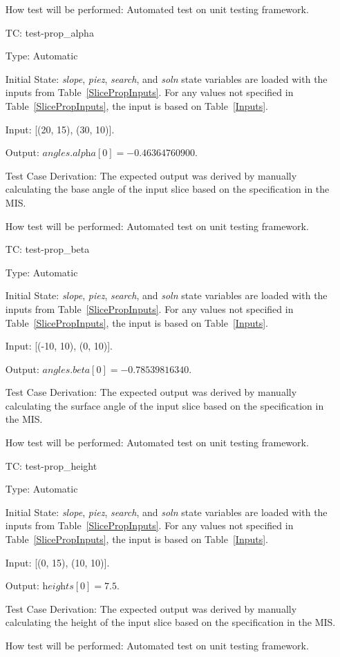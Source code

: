 \documentclass[12pt, titlepage]{article}
\newcounter{utestnum} %
\begin{document}
\begin{enumerate}[label=TC\arabic*:,ref={\arabic*}]
	How test will be performed: Automated test on unit testing framework.
	
	\item [TC\refstepcounter{utestnum}\theutestnum: 
	\label{TC_PropertyAlpha}] 
	test-prop\_alpha
	
	Type: Automatic
	
	Initial State: \textit{slope}, \textit{piez}, \textit{search}, and 
	\textit{soln} state variables are loaded with the inputs from 
	Table~\ref{SlicePropInputs}. For any values not specified in 
	Table~\ref{SlicePropInputs}, the input is based on Table~\ref{Inputs}.
	
	Input: [(20, 15), (30, 10)].
	
	Output: $\textit{angles.alpha}[0] = -0.46364760900$.
	
	Test Case Derivation: The expected output was derived by manually 
	calculating the base angle of the input slice based on the specification in 
	the MIS.
	
	How test will be performed: Automated test on unit testing framework.
	
	\item [TC\refstepcounter{utestnum}\theutestnum: 
	\label{TC_PropertyBeta}] 
	test-prop\_beta
	
	Type: Automatic
	
	Initial State: \textit{slope}, \textit{piez}, \textit{search}, and 
	\textit{soln} state variables are loaded with the inputs from 
	Table~\ref{SlicePropInputs}. For any values not specified in 
	Table~\ref{SlicePropInputs}, the input is based on Table~\ref{Inputs}.
	
	Input: [(-10, 10), (0, 10)].
	
	Output: $\textit{angles.beta}[0] = -0.78539816340$.
	
	Test Case Derivation: The expected output was derived by manually 
	calculating the surface angle of the input slice based on the specification 
	in the MIS.
	
	How test will be performed: Automated test on unit testing framework.
	
	\item [TC\refstepcounter{utestnum}\theutestnum: 
	\label{TC_PropertyHeight}] 
	test-prop\_height
	
	Type: Automatic
	
	Initial State: \textit{slope}, \textit{piez}, \textit{search}, and 
	\textit{soln} state variables are loaded with the inputs from 
	Table~\ref{SlicePropInputs}. For any values not specified in 
	Table~\ref{SlicePropInputs}, the input is based on Table~\ref{Inputs}.
	
	Input: [(0, 15), (10, 10)].
	
	Output: $\textit{heights}[0] = 7.5$.
	
	Test Case Derivation: The expected output was derived by manually 
	calculating the height of the input slice based on the specification in the 
	MIS.
	
	How test will be performed: Automated test on unit testing framework.
	
\end{enumerate}
\end{document}
